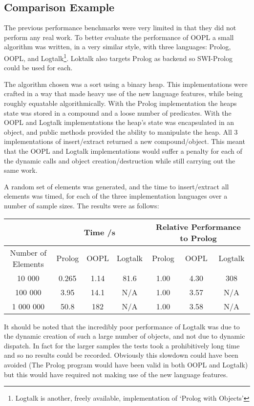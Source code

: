 \documentclass[12pt,a4paper,twoside,openright]{report}
\begin{document}
\subsection{Comparison Example}

The previous performance benchmarks were very limited in that they did not perform any real work. To better evaluate the performance of OOPL a small algorithm was written, in a very similar style, with three languages: Prolog, OOPL, and Logtalk\footnote{Logtalk is another, freely available, implementation of `Prolog with Objects'}. Loktalk also targets Prolog as backend so SWI-Prolog could be used for each.

\bigskip

The algorithm chosen was a sort using a binary heap. This implementations were crafted in a way that made heavy use of the new language features, while being roughly equatable algorithmically. With the Prolog implementation the heaps state was stored in a compound and a loose number of predicates. With the OOPL and Logtalk implementations the heap's state was encapsulated in an object, and public methods provided the ability to manipulate the heap. All 3 implementations of insert/extract returned a new compound/object. This meant that the OOPL and Logtalk implementations would suffer a penalty for each of the dynamic calls and object creation/destruction while still carrying out the same work.

\bigskip

A random set of elements was generated, and the time to insert/extract all elements was timed, for each of the three implementation languages over a number of sample sizes. The results were as follows:

\begin{center}
\begin{tabular}{c|c|c|c|c|c|c}
 & \multicolumn{3}{c}{Time /s} &  \multicolumn{3}{c}{Relative Performance to Prolog}\\
 \hline
Number of Elements 	& Prolog & OOPL & Logtalk & Prolog & OOPL & Logtalk \\
\hline
 10 000				& 0.265	& 1.14	& 81.6 & 1.00	& 4.30	& 308		\\
 100 000			& 3.95	& 14.1	& N/A  & 1.00	& 3.57	& N/A		\\
 1 000 000			& 50.8	&182 	& N/A  & 1.00	& 3.58	& N/A		\\
\end{tabular}
\end{center}

It should be noted that the incredibly poor performance of Logtalk was due to the dynamic creation of such a large number of objects, and not due to dynamic dispatch. In fact for the larger samples the tests took a prohibitively long time and so no results could be recorded. Obviously this slowdown could have been avoided (The Prolog program would have been valid in both OOPL and Logtalk) but this would have required not making use of the new language features.
\end{document}
